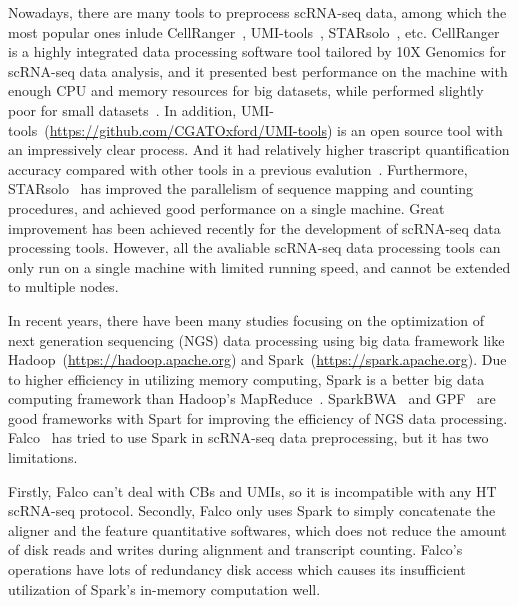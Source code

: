 \documentclass[conference]{IEEEtran}
\begin{document}
Nowadays, there are many tools to preprocess scRNA-seq data, among which the most popular ones inlude CellRanger~\cite{Zheng2017Massively}, UMI-tools~\cite{Smith2017UMItools},  STARsolo~\cite{Blibaum2019STARsolo}, etc. 
CellRanger is a highly integrated data processing software tool tailored by 10X Genomics for scRNA-seq data analysis, and it presented best performance on the machine with enough CPU and memory resources for big datasets, while performed slightly poor for small datasets~\cite{Gao2020Comparison}. 
In addition, UMI-tools~(\url{https://github.com/CGATOxford/UMI-tools}) is an open source tool with an impressively clear process. And it had relatively higher trascript quantification accuracy compared with other tools in a previous evalution~\cite{Gao2020Comparison}. 
Furthermore, STARsolo~\cite{Blibaum2019STARsolo} has improved the parallelism of sequence mapping and counting procedures, and achieved good performance on a single machine.
Great improvement has been achieved recently for the development of scRNA-seq data processing tools. However, all the avaliable scRNA-seq data processing tools can only run on a single machine with limited running speed, and cannot be extended to multiple nodes.

In recent years, there have been many studies focusing on the optimization of next generation sequencing (NGS) data processing using big data framework like Hadoop~(\url{https://hadoop.apache.org}) and Spark~(\url{https://spark.apache.org}). 
Due to higher efficiency in utilizing memory computing, Spark is a better big data computing framework than Hadoop's MapReduce~\cite{Dean2008MapReduce, Zaharia2012Resilient}. 
SparkBWA~\cite{Abun2016SparkBWA} and GPF~\cite{Li2018Highperformance} are good frameworks with Spart for improving the efficiency of NGS data processing. 
Falco~\cite{Yang2017Falco} has tried to use Spark in scRNA-seq data preprocessing, but it has two limitations. 

Firstly, Falco can't deal with CBs and UMIs, so it is incompatible with any HT scRNA-seq protocol.
Secondly, Falco only uses Spark to simply concatenate the aligner and the feature quantitative softwares, which does not reduce the amount of disk reads and writes during alignment and transcript counting.
Falco’s operations have lots of redundancy disk access which causes its insufficient utilization of Spark’s in-memory computation well. 
\end{document}
